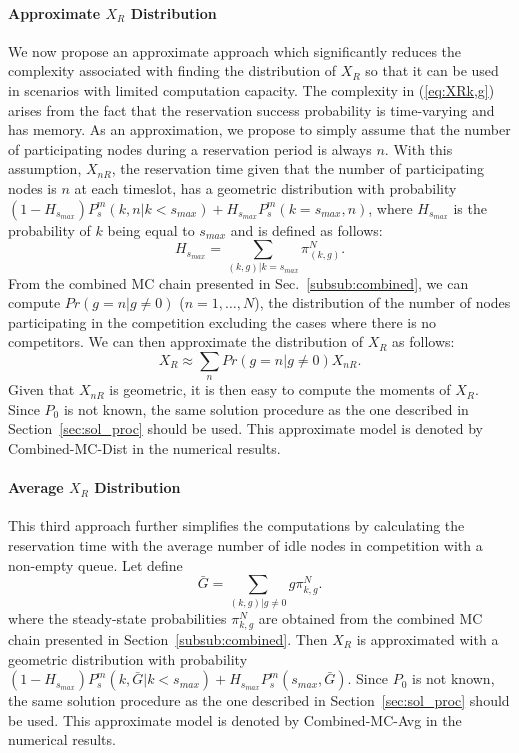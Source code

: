\documentclass[12pt,journal,oneside,onecolumn]{IEEEtran}
\begin{document}
\paragraph{Approximate $X_R$ Distribution}
\label{Avg}
We now propose an approximate approach which significantly reduces the complexity associated with finding
the distribution of $X_R$ so that it can be used in scenarios with limited computation capacity. 
The  complexity in (\ref{eq:XRk,g}) arises from the fact that the reservation success probability is time-varying
and has memory. As an approximation, we propose to simply assume that the number of participating nodes during a reservation period is always
$n$.  With this assumption, $X_{nR}$, the reservation time given that the number of participating nodes is $n$ at each timeslot,
has a geometric distribution with probability 
$(1-H_{s_{max}})P_s^m(k,n|k<s_{max})+H_{s_{max}}P_s^m(k=s_{max},n)$,
where $H_{s_{max}}$ is the probability of $k$ being equal to $s_{max}$ and is defined as follows:
\begin{equation}
H_{s_{max}}= \sum_{(k,g)|k=s_{max}}{\pi^{N}_{(k,g)}}.
\label{eq:}
\end{equation}
From the combined MC chain presented in Sec.~\ref{subsub:combined}, we can compute
$Pr(g=n|g \neq 0)$ ($n=1,\dots,N$), the distribution of the number of nodes participating in the competition
excluding the cases where there is no competitors. We can then approximate the distribution of $X_R$ as follows:
\begin{equation}
X_R \approx \sum_{n} Pr(g=n|g \neq 0) X_{nR}.
\label{eq:}
\end{equation}
Given that $X_{nR}$ is geometric, it is then easy to compute the moments of $X_R$.
Since $P_0$ is not known, 
the same solution procedure as the one described in Section~\ref{sec:sol_proc} should be used.
This approximate model is denoted by Combined-MC-Dist in the numerical results.

\paragraph{Average $X_R$ Distribution}
This third approach further simplifies the computations by calculating the reservation time with the average number of idle nodes in competition with a non-empty queue.
Let define 
\begin{equation}
\bar{G} = \sum_{(k,g)|g\neq 0} {g \pi^{N}_{k,g}}.
\label{eq:}
\end{equation}
where the steady-state probabilities $\pi^{N}_{k,g}$ are obtained from the combined MC chain presented in Section~\ref{subsub:combined}.
Then $X_R$ is approximated with a geometric distribution with 
probability $(1-H_{s_{max}})P_s^m(k,\bar{G}|k<s_{max})+H_{s_{max}}P_s^m(s_{max},\bar{G})$.
Since $P_0$ is not known, 
the same solution procedure as the one described in Section~\ref{sec:sol_proc} should be used.
This approximate model is denoted by Combined-MC-Avg in the numerical results.
\end{document}
